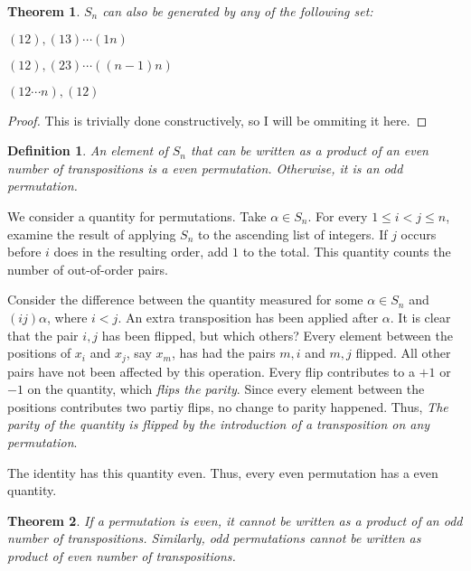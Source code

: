 \documentclass{article}
\newtheorem{theorem}{Theorem}[section]
\newtheorem{definition}{Definition}[section]
\begin{document}
\begin{theorem}
    $S_n$ can also be generated by any of the following set:
    \begin{compactenum}
        \item $(12),(13) \cdots (1n)$
        \item $(12),(23) \cdots ((n-1)n)$
        \item $(12 \cdots n), (12)$
    \end{compactenum}
\end{theorem}
\begin{proof}
    This is trivially done constructively, so I will be ommiting it here.
\end{proof}

\begin{definition}
    An element of $S_n$ that can be written as a product of an even number of transpositions is a \emph{even permutation}.
    Otherwise, it is an \emph{odd permutation}.
\end{definition}

We consider a quantity for permutations. Take $\alpha \in S_n$.
For every $1 \le i < j \le n$, examine the result of applying $S_n$ to the ascending list of integers.
If $j$ occurs before $i$ does in the resulting order, add $1$ to the total.
This quantity counts the number of out-of-order pairs.

Consider the difference between the quantity measured for some $\alpha \in S_n$ and $(ij)\alpha$, where $i < j$.
An extra transposition has been applied after $\alpha$.
It is clear that the pair $i,j$ has been flipped, but which others?
Every element between the positions of $x_i$ and $x_j$, say $x_m$, has had the pairs $m,i$ and $m,j$ flipped.
All other pairs have not been affected by this operation.
Every flip contributes to a $+1$ or $-1$ on the quantity, which \emph{flips the parity}.
Since every element between the positions contributes two partiy flips, no change to parity happened.
Thus, \emph{The parity of the quantity is flipped by the introduction of a transposition on any permutation}.

The identity has this quantity even. Thus, every even permutation has a even quantity.

\begin{theorem}
    If a permutation is even, it cannot be written as a product of an odd number of transpositions.
    Similarly, odd permutations cannot be written as product of even number of transpositions.
\end{theorem}
\end{document}
